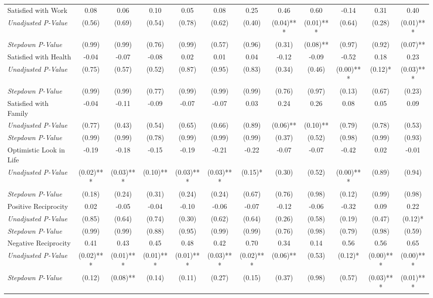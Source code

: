 \begin{tabular}{l c c c c c c c c c c c}
Satisfied with Work & 0.08 & 0.06 & 0.10 & 0.05 & 0.08 & 0.25 & 0.46 & 0.60 & -0.14 & 0.31 & 0.40 \\
\quad \textit{Unadjusted P-Value} & (0.56) & (0.69) & (0.54) & (0.78) & (0.62) & (0.40) & (0.04)*** & (0.01)*** & (0.64) & (0.28) & (0.01)*** \\
\quad \textit{Stepdown P-Value} & (0.99) & (0.99) & (0.76) & (0.99) & (0.57) & (0.96) & (0.31) & (0.08)** & (0.97) & (0.92) & (0.07)** \\
Satisfied with Health & -0.04 & -0.07 & -0.08 & 0.02 & 0.01 & 0.04 & -0.12 & -0.09 & -0.52 & 0.18 & 0.23 \\
\quad \textit{Unadjusted P-Value} & (0.75) & (0.57) & (0.52) & (0.87) & (0.95) & (0.83) & (0.34) & (0.46) & (0.00)*** & (0.12)* & (0.03)*** \\
\quad \textit{Stepdown P-Value} & (0.99) & (0.99) & (0.77) & (0.99) & (0.99) & (0.99) & (0.76) & (0.97) & (0.13) & (0.67) & (0.23) \\
Satisfied with Family & -0.04 & -0.11 & -0.09 & -0.07 & -0.07 & 0.03 & 0.24 & 0.26 & 0.08 & 0.05 & 0.09 \\
\quad \textit{Unadjusted P-Value} & (0.77) & (0.43) & (0.54) & (0.65) & (0.66) & (0.89) & (0.06)** & (0.10)** & (0.79) & (0.78) & (0.53) \\
\quad \textit{Stepdown P-Value} & (0.99) & (0.99) & (0.78) & (0.99) & (0.99) & (0.99) & (0.37) & (0.52) & (0.98) & (0.99) & (0.93) \\
Optimistic Look in Life & -0.19 & -0.18 & -0.15 & -0.19 & -0.21 & -0.22 & -0.07 & -0.07 & -0.42 & 0.02 & -0.01 \\
\quad \textit{Unadjusted P-Value} & (0.02)*** & (0.03)*** & (0.10)** & (0.03)*** & (0.03)*** & (0.15)* & (0.30) & (0.52) & (0.00)*** & (0.89) & (0.94) \\
\quad \textit{Stepdown P-Value} & (0.18) & (0.24) & (0.31) & (0.24) & (0.24) & (0.67) & (0.76) & (0.98) & (0.12) & (0.99) & (0.98) \\
Positive Reciprocity & 0.02 & -0.05 & -0.04 & -0.10 & -0.06 & -0.07 & -0.12 & -0.06 & -0.32 & 0.09 & 0.22 \\
\quad \textit{Unadjusted P-Value} & (0.85) & (0.64) & (0.74) & (0.30) & (0.62) & (0.64) & (0.26) & (0.58) & (0.19) & (0.47) & (0.12)* \\
\quad \textit{Stepdown P-Value} & (0.99) & (0.99) & (0.88) & (0.95) & (0.99) & (0.99) & (0.76) & (0.98) & (0.79) & (0.98) & (0.59) \\
Negative Reciprocity & 0.41 & 0.43 & 0.45 & 0.48 & 0.42 & 0.70 & 0.34 & 0.14 & 0.56 & 0.56 & 0.65 \\
\quad \textit{Unadjusted P-Value} & (0.02)*** & (0.01)*** & (0.01)*** & (0.01)*** & (0.03)*** & (0.02)*** & (0.06)** & (0.53) & (0.12)* & (0.00)*** & (0.00)*** \\
\quad \textit{Stepdown P-Value} & (0.12) & (0.08)** & (0.14) & (0.11) & (0.27) & (0.15) & (0.37) & (0.98) & (0.57) & (0.03)*** & (0.01)*** \\
\bottomrule
\end{tabular}
